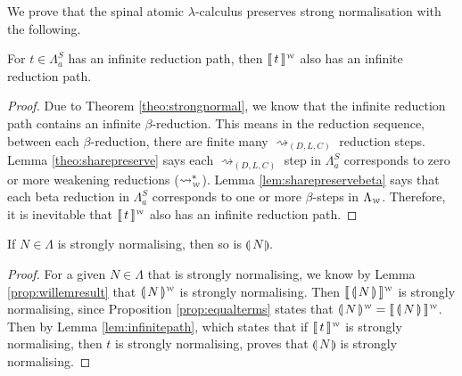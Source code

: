 \documentclass[a4paper,UKenglish,cleveref, autoref]{lipics-v2019}
\newcommand{\FALC}{\Lambda^{S}_{a}}
\newcommand{\WEAK}{\Lambda_{\weaksymbol}}
\newcommand{\compile}[1]{\llparenthesis \, #1 \, \rrparenthesis}
\newcommand{\weaksymbol}{\mbox{\tiny $\mathcal{W}$}}
\newcommand{\compweak}[1]{\llparenthesis \, #1 \, \rrparenthesis^{\weaksymbol}}
\newcommand{\composeweak}[1]{\llbracket \, #1 \, \rrbracket^{\weaksymbol}}
\begin{document}
\noindent We prove that the spinal atomic $\lambda$-calculus preserves strong normalisation with the following.



\begin{lemma}
\label{lem:infinitepath}
For $t \in \FALC$ has an infinite reduction path, then $\composeweak{t}$ also has an infinite reduction path.
\end{lemma}

\begin{proof}
Due to Theorem \ref{theo:strongnormal}, we know that the infinite reduction path contains an infinite $\beta$-reduction. This means in the reduction sequence, between each $\beta$-reduction, there are finite many $\rightsquigarrow_{(D, L, C)}$ reduction steps. Lemma \ref{theo:sharepreserve} says each $\rightsquigarrow_{(D, L, C)}$ step in $\FALC$ corresponds to zero or more weakening reductions ($\rightsquigarrow^{*}_{\weaksymbol}$). Lemma \ref{lem:sharepreservebeta} says that each beta reduction in $\FALC$ corresponds to one or more $\beta$-steps in $\WEAK$. Therefore, it is inevitable that $\composeweak{t}$ also has an infinite reduction path.
\end{proof}


%

\begin{theorem}
 If $N \in \Lambda$ is strongly normalising, then so is $\compile{N}$.
\end{theorem}

\begin{proof}
For a given $N \in \Lambda$ that is strongly normalising, we know by Lemma \ref{prop:willemresult} that $\compweak{N}$ is strongly normalising. Then $\composeweak{\compile{N}}$ is strongly normalising, since Proposition \ref{prop:equalterms} states that $\compweak{N} = \composeweak{\compile{N}}$. Then by Lemma \ref{lem:infinitepath}, which states that if $\composeweak{t}$ is strongly normalising, then $t$ is strongly normalising, proves that $\compile{N}$ is strongly normalising.
\end{proof}
\end{document}
